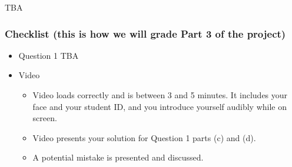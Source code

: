 \documentclass[12pt, oneside]{article}
\begin{document}
TBA


\subsubsection*{Checklist (this is how we will grade Part 3 of the project)}
\begin{itemize}
    \item Question 1 TBA
\item Video
    \begin{itemize}
        \item Video loads correctly and is between 3 and 5 minutes. It includes your face and your student ID, 
        and you introduce yourself audibly while on screen.
        \item Video presents your solution for Question 1 parts (c) and (d).
        \item A potential mistake is presented and discussed.
    \end{itemize}
\end{itemize}
\end{document}
